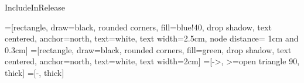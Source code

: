 %
\usepackage[main=english,portuguese]{babel}
\usepackage[utf8]{inputenc}
\usepackage{iflang}

\usepackage[margin={2cm, 2cm}]{geometry}
\setlength{\columnsep}{1cm}

\usepackage[printonlyused,nolist]{acronym}

\usepackage{cite}

\usepackage[pdftex]{graphicx}

\usepackage[cmex10]{amsmath}

\usepackage{algorithmic}

\usepackage{array}

\usepackage[caption=false,font=normalsize,labelfont=sf,textfont=sf]{subfig}
\usepackage[style=base]{caption}
\captionsetup[table]{skip=10pt}

\begingroup\expandafter\expandafter\expandafter\endgroup
\expandafter\ifx\csname IncludeInRelease\endcsname\relax
  \usepackage{fixltx2e}
\fi

\usepackage{url}

\usepackage{eso-pic}
\usepackage[
  contents={},
  opacity=1,
  scale=1,
  color=blue!90
  ]{background}

\usepackage{ifthen}

\usepackage[]{cleveref}

\usepackage{amsmath}
\usepackage{graphicx}
\usepackage{xcolor}
\usepackage{tikz}
\usepackage{float}
\usetikzlibrary{positioning,shapes,shadows,arrows}
=[rectangle, draw=black, rounded corners, fill=blue!40, drop shadow,
        text centered, anchor=north, text=white, text width=2.5cm, node distance= 1cm and 0.3cm]
=[rectangle, draw=black, rounded corners, fill=green, drop shadow,
        text centered, anchor=north, text=white, text width=2cm]
=[->, >=open triangle 90, thick]
=[-, thick]

\usepackage{hyperref}

\usepackage{listings}
\usepackage{booktabs}
